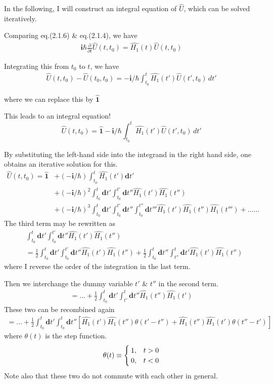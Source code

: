  In the following, I will construct an integral equation of $\hat{U}$, which can be solved iteratively.

 Comparing eq.(2.1.6) \& eq.(2.1.4), we have
\begin{align}\tag{2.1.6''}
\bm{i}\hbar \frac{\partial}{\partial t} \hat{U}(t,t_0)=\hat{H_1}(t)\hat{U}(t,t_0) \nonumber
\end{align}

 Integrating this from $t_0$ to $t$, we have 
\begin{align}
\hat{U}(t,t_0)-\hat{U}(t_0,t_0)=-\bm{i}/\hbar \int_{t_0}^{t} \hat{H_1}(t')\hat{U}(t',t_0)\,dt' \nonumber
\end{align}

 where we can replace this by $\hat{\bm{1}}$

 This leads to an integral equation!
\begin{equation}
\hat{U}(t,t_0)=\hat{\bm{1}}-\bm{i}/\hbar \int_{t_0}^{t} \hat{H_1}(t')\hat{U}(t',t_0)\,dt' \nonumber
\end{equation}

 By substituting the left-hand side into the integrand in the right hand side, one obtains an iterative solution for this.
\begin{align}
\hat{U}(t,t_0)=\hat{\bm{1}} &+(-\bm{i}/\hbar) \int_{t_0}^{t} \hat{H_1}(t')\bm{d}t' \nonumber\\
&+(-\bm{i}/\hbar)^2\int_{t_0}^{t}\bm{d}t'\int_{t_0}^{t'}\bm{d}t''\hat{H_1}(t')\hat{H_1}(t'')\nonumber\\
&+(-\bm{i}/\hbar)^3  \int_{t_0}^{t}\bm{d}t'\int_{t_0}^{t'}\bm{d}t''\int_{t_0}^{t''}\bm{d}t'''\hat{H_1}(t')\hat{H_1}(t'')\hat{H_1}(t''')+...... \nonumber
\end{align}
The third term may be rewritten as
\begin{align}
&\int_{t_0}^{t}\bm{d}t'\int_{t_0}^{t'}\bm{d}t''\hat{H_1}(t')\hat{H_1}(t'')\nonumber\\
&=\frac{1}{2}\int_{t_0}^{t}\bm{d}t'\int_{t_0}^{t'}\bm{d}t''\hat{H_1}(t')\hat{H_1}(t'')+\frac{1}{2}\int_{t_0}^{t}\bm{d}t''\int_{t''}^{t}\bm{d}t'\hat{H_1}(t')\hat{H_1}(t'')\nonumber
\end{align}
where I reverse the order of the integration in the last term.

 Then we interchange the dummy variable $t'$ \& $t''$ in the second term.
\begin{align}
=...+\frac{1}{2}\int_{t_0}^{t}\bm{d}t'\int_{t'}^{t}\bm{d}t''\hat{H_1}(t'')\hat{H_1}(t')\nonumber
\end{align}
 These two can be recombined again
\begin{align}
=...+\frac{1}{2}\int_{t_0}^{t}\bm{d}t'\int_{t_0}^{t}\bm{d}t''[\hat{H_1}(t')\hat{H_1}(t'')\theta(t'-t'')+\hat{H_1}(t'')\hat{H_1}(t')\theta(t''-t')]\nonumber
\end{align}
where $\theta(t)$ is the step function.
\begin{eqnarray}
\theta(t)\equiv
\begin{cases}
1, &t>0 \cr 0, &t<0\end{cases} \nonumber
\end{eqnarray}
 Note also that these two do not commute with each other in general.

